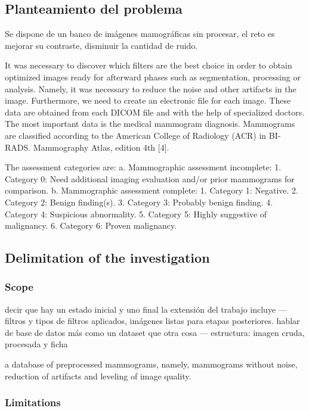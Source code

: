 \subsection{Planteamiento del problema}

Se dispone de un banco de imágenes mamográficas sin procesar, el reto es mejorar
su contraste, disminuir la cantidad de ruido.

It was necessary to discover which filters are the best choice in order to
obtain optimized images ready for afterward phases such as segmentation,
processing or analysis. Namely, it was necessary to reduce the noise and other
artifacts in the image. Furthermore, we need to create an electronic file for
each image. These data are obtained from each DICOM file and with the help of
specialized doctors.  The most important data is the medical mammogram
diagnosis. Mammograms are classified according to the American College of
Radiology (ACR) in BI-RADS. Mammography Atlas, edition 4th [4].

The assessment categories are:
a. Mammographic assessment incomplete:
1. Category 0: Need additional imaging evaluation and/or prior mammograms for comparison.
b. Mammographic assessment complete:
1. Category 1: Negative.
2. Category 2: Benign finding(s).
3. Category 3: Probably benign finding.
4. Category 4: Suspicious abnormality.
5. Category 5: Highly suggestive of malignancy.         
6. Category 6: Proven malignancy.

\subsection{Delimitation of the investigation}
\subsubsection{Scope}

decir que hay un estado inicial y uno final
la extensión del trabajo incluye --- filtros y tipos de filtros aplicados, imágenes listas para etapas posteriores. 
hablar de base de datos más como un dataset que otra cosa --- estructura: imagen cruda, procesada y ficha

a database of preprocessed mammograms, namely, mammograms without noise,
reduction of artifacts and leveling of image quality.

\subsubsection{Limitations}

